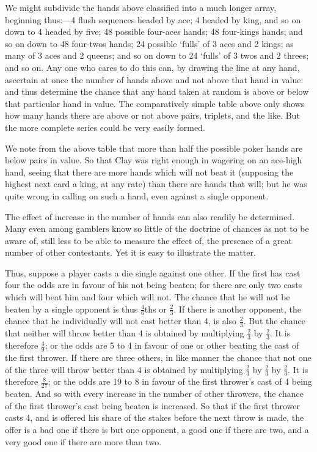\documentclass[letterpaper,12pt,oneside,openany]{memoir}
\begin{document}
We might subdivide the hands above classified into a
much longer array, beginning thus:---4 flush sequences
headed by ace; 4 headed by king, and so on down to 4
headed by five; 48 possible four-aces hands; 48 four-kings
hands; and so on down to 48 four-twos hands;
24 possible `fulls' of 3 aces and 2 kings; as many of 3
aces and 2 queens; and so on down to 24 `fulls' of 3
twos and 2 threes; and so on. Any one who cares to do
this can, by drawing the line at any hand, ascertain at
once the number of hands above and not above that
hand in value: and thus determine the chance that any
hand taken at random is above or below that particular
hand in value. The comparatively simple table above
only shows how many hands there are above or not
above pairs, triplets, and the like. But the more complete
series could be very easily formed.

We note from the above table that more than half the
possible poker hands are below pairs in value. So that
Clay was right enough in wagering on an ace-high
hand, seeing that there are more hands which will not
beat it (supposing the highest next card a king, at any
rate) than there are hands that will; but he was quite
wrong in calling on such a hand, even against a single
opponent.

The effect of increase in the number of hands can
also readily be determined. Many even among gamblers
know so little of the doctrine of chances as not to
be aware of, still less to be able to measure the effect of,
the presence of a great number of other contestants.
Yet it is easy to illustrate the matter.

Thus, suppose a player casts a die single against one
other. If the first has cast four the odds are in favour
of his not being beaten; for there are only two casts
which will beat him and four which will not. The
chance that he will not be beaten by a single opponent
is thus $\frac{4}{6}$ths or $\frac{2}{3}$. If there is another opponent, the
chance that he individually will not cast better than 4,
is also $\frac{2}{3}$. But the chance that neither will throw better
than 4 is obtained by multiplying $\frac{2}{3}$ by $\frac{2}{3}$. It is therefore
$\frac{4}{9}$; or the odds are 5 to 4 in favour of one or other
beating the cast of the first thrower. If there are three
others, in like manner the chance that not one of the
three will throw better than 4 is obtained by multiplying
$\frac{2}{3}$ by $\frac{2}{3}$ by $\frac{2}{3}$. It is therefore $\frac{8}{27}$; or the odds are 19
to 8 in favour of the first thrower's cast of 4 being
beaten. And so with every increase in the number of
other throwers, the chance of the first thrower's cast
being beaten is increased. So that if the first thrower
casts 4, and is offered his share of the stakes before the
next throw is made, the offer is a bad one if there is
but one opponent, a good one if there are two, and a
very good one if there are more than two.
\end{document}
